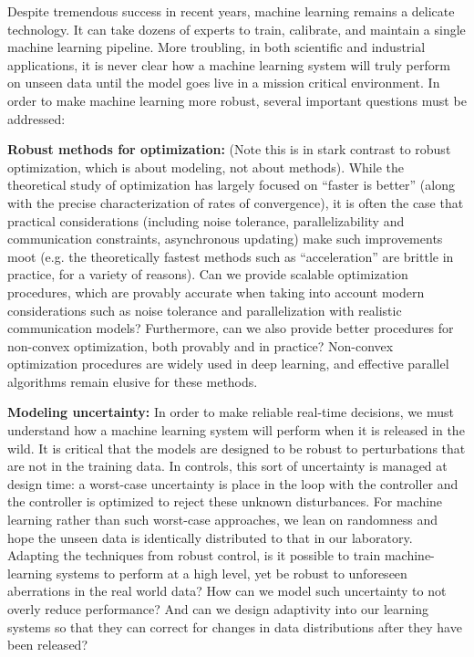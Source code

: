 Despite tremendous success in recent years, machine learning remains a delicate technology. It can take dozens of experts to train, calibrate, and maintain a single machine learning pipeline. More troubling, in both scientific and industrial applications, it is never clear how a machine learning system will truly perform on unseen data until the model goes live in a mission critical environment. In order to make machine learning more robust, several important questions must be addressed:

{\bf Robust methods for optimization:}  (Note this is in stark contrast to robust optimization, which is about modeling, not about methods).    While the theoretical study of optimization has largely focused on ``faster is better'' (along with the precise characterization of rates of convergence), it is often the case that practical considerations (including noise tolerance, parallelizability and communication constraints, asynchronous updating) make such improvements moot (e.g. the theoretically fastest methods such as ``acceleration'' are brittle in practice, for a variety of reasons). Can we provide scalable optimization procedures, which are provably accurate when taking into account modern considerations such as noise tolerance and parallelization with realistic communication models? Furthermore, can we also provide better procedures for non-convex optimization, both provably and in practice? Non-convex optimization procedures are widely used in deep learning, and effective parallel algorithms remain elusive for these methods.

{\bf Modeling uncertainty:} In order to make reliable real-time decisions, we must understand how a machine learning system will perform when it is released in the wild.  It is critical that the models are designed to be robust to perturbations that are not in the training data.  In controls, this sort of uncertainty is managed at design time: a worst-case uncertainty is place in the loop with the controller and the controller is optimized to reject these unknown disturbances.  For machine learning rather than such worst-case approaches, we lean on randomness and hope the unseen data is identically distributed to that in our laboratory.  Adapting the techniques from robust control, is it possible to train machine-learning systems to perform at a high level, yet be robust to unforeseen aberrations in the real world data?  How can we model such uncertainty to not overly reduce performance?  And can we design adaptivity into our learning systems so that they can correct for changes in data distributions after they have been released?

